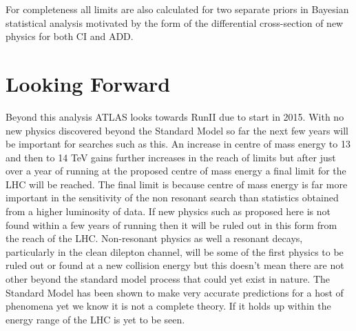 For completeness all limits are also calculated for two separate priors in Bayesian statistical analysis motivated by the form of the differential cross-section of new physics for both CI and ADD.


\section{Looking Forward}

Beyond this analysis ATLAS looks towards RunII due to start in 2015. With no new physics discovered beyond the Standard Model so far the next few years will be important for searches such as this. An increase in centre of mass energy to 13 and then to 14 TeV gains further increases in the reach of limits but after just over a year of running at the proposed centre of mass energy a final limit for the LHC will be reached. The final limit is because centre of mass energy is far more important in the sensitivity of the non resonant search than statistics obtained from a higher luminosity of data. If new physics such as proposed here is not found within a few years of running then it will be ruled out in this form from the reach of the LHC. Non-resonant physics as well a resonant decays, particularly in the clean dilepton channel, will be some of the first physics to be ruled out or found at a new collision energy but this doesn't mean there are not other beyond the standard model process that could yet exist in nature. The Standard Model has been shown to make very accurate predictions for a host of phenomena yet we know it is not a complete theory. If it holds up within the energy range of the LHC is yet to be seen. 





